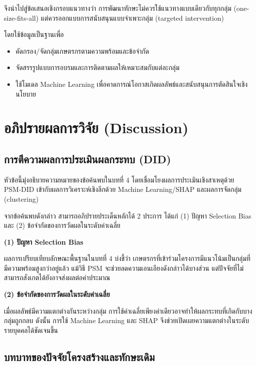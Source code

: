 \begin{enumerate}
จึงนำไปสู่ข้อเสนอเชิงกรอบแนวทางว่า การพัฒนาทักษะไม่ควรใช้แนวทางแบบเดียวกับทุกกลุ่ม (one-size-fits-all) แต่ควรออกแบบการสนับสนุนแบบจำเพาะกลุ่ม (targeted intervention)

โดยใช้ข้อมูลเป็นฐานเพื่อ

\begin{itemize}
\item คัดกรอง/จัดกลุ่มเกษตรกรตามความพร้อมและข้อจำกัด
\item จัดสรรรูปแบบการอบรมและการติดตามผลให้เหมาะสมกับแต่ละกลุ่ม
\item ใช้โมเดล Machine Learning เพื่อคาดการณ์โอกาสเกิดผลลัพธ์และสนับสนุนการตัดสินใจเชิงนโยบาย
\end{itemize}

\end{enumerate}

\section{อภิปรายผลการวิจัย (Discussion)}

\subsection{การตีความผลการประเมินผลกระทบ (DID)}

หัวข้อนี้มุ่งอธิบายความหมายของข้อค้นพบในบทที่ 4 โดยเชื่อมโยงผลการประเมินเชิงสาเหตุด้วย PSM-DID เข้ากับผลการวิเคราะห์เชิงลึกด้วย Machine Learning/SHAP และผลการจัดกลุ่ม (clustering)

จากข้อค้นพบดังกล่าว สามารถอภิปรายประเด็นหลักได้ 2 ประการ ได้แก่ (1) ปัญหา Selection Bias และ (2) ข้อจำกัดของการวัดผลในระดับค่าเฉลี่ย

\textbf{(1) ปัญหา Selection Bias}

ผลการเปรียบเทียบลักษณะพื้นฐานในบทที่ 4 บ่งชี้ว่า เกษตรกรที่เข้าร่วมโครงการมีแนวโน้มเป็นกลุ่มที่มีความพร้อมสูงกว่าอยู่แล้ว แม้วิธี PSM จะช่วยลดความเอนเอียงดังกล่าวได้บางส่วน แต่ปัจจัยที่ไม่สามารถสังเกตได้ยังอาจส่งผลต่อค่าประมาณ

\textbf{(2) ข้อจำกัดของการวัดผลในระดับค่าเฉลี่ย}

เมื่อผลลัพธ์มีความแตกต่างกันระหว่างกลุ่ม การใช้ค่าเฉลี่ยเพียงค่าเดียวอาจทำให้ผลกระทบที่เกิดกับบางกลุ่มถูกกลบ ดังนั้น การใช้ Machine Learning และ SHAP จึงช่วยเปิดเผยความแตกต่างในระดับรายบุคคลได้ชัดเจนขึ้น

\subsection{บทบาทของปัจจัยโครงสร้างและทักษะเดิม}

